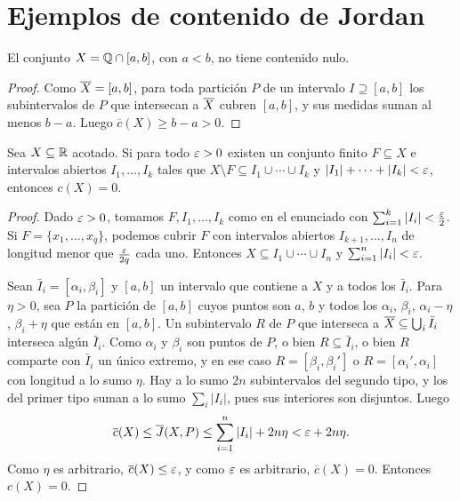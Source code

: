 \section{Ejemplos de contenido de Jordan}

\begin{eg}
  El conjunto \(X = \mathbb{Q} \cap [a, b]\), con \(a < b\), no tiene contenido nulo.
\end{eg}

\begin{proof}
  Como \(\overline{X} = [a, b]\), para toda partición \(P\) de un intervalo \(I \supseteq [a, b]\) los subintervalos de \(P\) que intersecan a \(\overline{X}\) cubren \([a, b]\), y sus medidas suman al menos \(b - a\). Luego \(\overline{c}(X) \geq b - a > 0\).
\end{proof}

\begin{lemma}
  Sea \(X \subseteq \mathbb{R}\) acotado. Si para todo \(\varepsilon > 0\) existen un conjunto finito \(F \subseteq X\) e intervalos abiertos \(I_1, \dots, I_k\) tales que \(X \setminus F \subseteq I_1 \cup \cdots \cup I_k\) y \(|I_1| + \cdots + |I_k| < \varepsilon\), entonces \(c(X) = 0\).
\end{lemma}

\begin{proof}
  Dado \(\varepsilon > 0\), tomamos \(F, I_1, \dots, I_k\) como en el enunciado con \(\sum_{i=1}^k |I_i| < \frac{\varepsilon}{2}\). Si \(F = \{x_1, \dots, x_q\}\), podemos cubrir \(F\) con intervalos abiertos \(I_{k+1}, \dots, I_n\) de longitud menor que \(\frac{\varepsilon}{2q}\) cada uno. Entonces \(X \subseteq I_1 \cup \cdots \cup I_n\) y \(\sum_{i=1}^n |I_i| < \varepsilon\).

  Sean \(\bar{I}_i = [\alpha_i, \beta_i]\) y \([a, b]\) un intervalo que contiene a \(X\) y a todos los \(\bar{I}_i\). Para \(\eta > 0\), sea \(P\) la partición de \([a, b]\) cuyos puntos son \(a\), \(b\) y todos los \(\alpha_i\), \(\beta_i\), \(\alpha_i - \eta\), \(\beta_i + \eta\) que están en \([a, b]\). Un subintervalo \(R\) de \(P\) que interseca a \(\overline{X} \subseteq \bigcup_i \bar{I}_i\) interseca algún \(\bar{I}_i\). Como \(\alpha_i\) y \(\beta_i\) son puntos de \(P\), o bien \(R \subseteq \bar{I}_i\), o bien \(R\) comparte con \(\bar{I}_i\) un único extremo, y en ese caso \(R = [\beta_i, \beta_i']\) o \(R = [\alpha_i', \alpha_i]\) con longitud a lo sumo \(\eta\). Hay a lo sumo \(2n\) subintervalos del segundo tipo, y los del primer tipo suman a lo sumo \(\sum_i |I_i|\), pues sus interiores son disjuntos. Luego
  \[
    \overline{c}(X) \leq \overline{J}(X, P) \leq \sum_{i=1}^n |I_i| + 2n\eta < \varepsilon + 2n\eta.
  \]
  Como \(\eta\) es arbitrario, \(\overline{c}(X) \leq \varepsilon\), y como \(\varepsilon\) es arbitrario, \(\overline{c}(X) = 0\). Entonces \(c(X) = 0\).
\end{proof}

